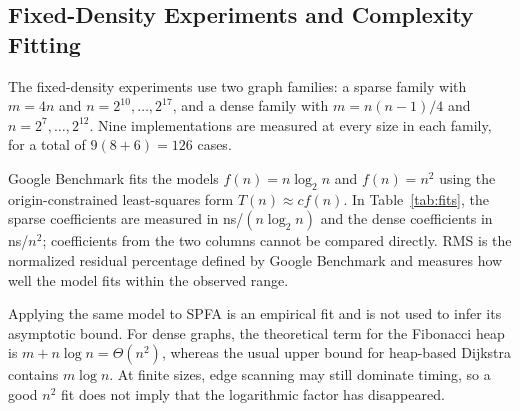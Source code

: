 \subsection{Fixed-Density Experiments and Complexity Fitting}
The fixed-density experiments use two graph families: a sparse family with $m=4n$
and $n=2^{10},\ldots,2^{17}$, and a dense family with $m=n(n-1)/4$ and
$n=2^7,\ldots,2^{12}$. Nine implementations are measured at every size in each
family, for a total of $9(8+6)=126$ cases.

Google Benchmark fits the models $f(n)=n\log_2n$ and $f(n)=n^2$ using the
origin-constrained least-squares form $T(n)\approx c f(n)$. In Table~\ref{tab:fits},
the sparse coefficients are measured in ns/$(n\log_2n)$ and the dense coefficients
in ns/$n^2$; coefficients from the two columns cannot be compared directly. RMS is
the normalized residual percentage defined by Google Benchmark and measures how well
the model fits within the observed range.

\begin{table}[H]\centering\small
\caption{CPU coefficients and RMS for the fixed models. All values are exported from the CSV data.}\label{tab:fits}

\end{table}
Applying the same model to SPFA is an empirical fit and is not used to infer its
asymptotic bound. For dense graphs, the theoretical term for the Fibonacci heap is
$m+n\log n=\Theta(n^2)$, whereas the usual upper bound for heap-based Dijkstra
contains $m\log n$. At finite sizes, edge scanning may still dominate timing, so a
good $n^2$ fit does not imply that the logarithmic factor has disappeared.
\FloatBarrier
